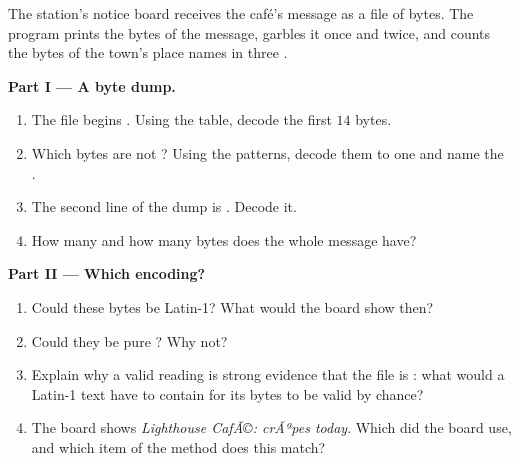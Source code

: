 \begin{problem}\label{pb:g10:text-encodings:1}
The station's notice board receives the café's message as a file of bytes. The program
 prints the bytes of the message, garbles it once and twice, and counts the bytes of
the town's place names in three .

\medskip\noindent\textbf{Part I --- A byte dump.}
\begin{enumerate}
  \item The file begins . Using the  table, decode the
    first $14$ bytes.
  \item Which bytes are not ? Using the  patterns, decode them to one  and name the .
  \item The second line of the dump is . Decode it.
  \item How many  and how many bytes does the whole message have?
\end{enumerate}

\medskip\noindent\textbf{Part II --- Which encoding?}
\begin{enumerate}[resume]
  \item Could these bytes be Latin-1? What would the board show then?
  \item Could they be pure ? Why not?
  \item Explain why a valid  reading is strong evidence that the file is : what would a Latin-1 text have to
    contain for its bytes to be valid  by chance?
  \item The board shows \textit{Lighthouse CafÃ©: crÃªpes today}. Which  did the board use, and which item of
    the method does this match?
\end{enumerate}


\end{problem}
